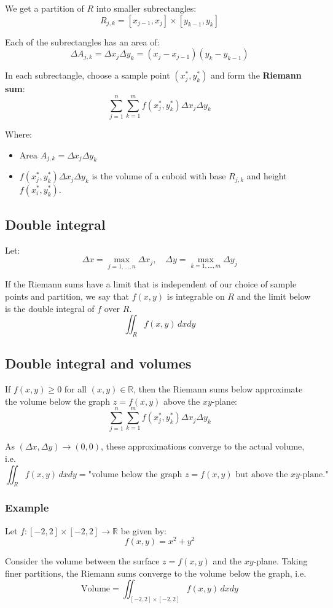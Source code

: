 \documentclass[11pt]{article}
\begin{document}
We get a partition of \(R\) into smaller subrectangles:
\[R_{j, k} = [x_{j - 1}, x_j] \times [y_{k - 1}, y_k]\]

Each of the subrectangles has an area of:
\[\Delta A_{j, k} = \Delta x_j \Delta y_k = (x_j - x_{j - 1})(y_k - y_{k - 1})\]

In each subrectangle, choose a sample point \((x_j^*, y_k^*)\) and form the \textbf{Riemann sum}:
\[\sum_{j = 1}^n \sum_{k = 1}^m f(x_j^*, y_k^*) \Delta x_j \Delta y_k\]

Where:
\begin{itemize}
\item \(\text{Area } A_{j, k} = \Delta x_j \Delta y_k\)
\item \(f(x_j^*, y_k^*) \Delta x_j \Delta y_k\) is the volume of a cuboid with base \(R_{j, k}\) and height \(f(x_i^*, y_k^*)\).
\end{itemize}
\subsection{Double integral}
\label{sec:org867dacc}
Let:
\[\Delta x = \max_{j = 1, \ldots, n} \Delta x_j, \quad \Delta y = \max_{k = 1, \ldots, m} \Delta y_j\]

If the Riemann sums have a limit that is independent of our choice of sample points and partition, we say that \(f(x, y)\) is integrable on \(R\) and the limit below is the double integral of \(f\) over \(R\).
\[\iint_R f(x, y) \, dx dy\]
\subsection{Double integral and volumes}
\label{sec:org68b518b}
If \(f(x, y) \ge 0\) for all \((x, y) \in \mathbb{R}\), then the Riemann sums below approximate the volume below the graph \(z = f(x, y)\) above the \(xy\)-plane:
\[\sum_{j = 1}^n \sum_{k = 1}^m f(x_j^*, y_k^*) \Delta x_j \Delta y_k\]

As \((\Delta x, \Delta y) \rightarrow (0, 0)\), these approximations converge to the actual volume, i.e.
\[\iint_R f(x, y) \, dx dy = \text{"volume below the graph } z = f(x, y) \text{ but above the } xy \text{-plane."}\]
\subsubsection{Example}
\label{sec:org315b7de}
Let \(f : [-2, 2] \times [-2, 2] \rightarrow \mathbb{R}\) be given by:
\[f(x, y) = x^2 + y^2\]

Consider the volume between the surface \(z = f(x, y)\) and the \(xy\)-plane. Taking finer partitions, the Riemann sums converge to the volume below the graph, i.e.
\[\text{Volume} = \iint_{[-2, 2] \times [-2, 2]} f(x, y) \, dx dy\]
\end{document}
